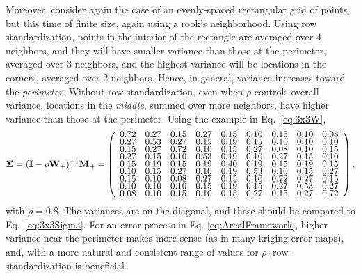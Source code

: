 \documentclass[11pt, titlepage]{article}\usepackage[]{graphicx}\usepackage[]{color}
\begin{document}
\begin{spacing}{1.9}
\begin{flushleft}
Moreover, consider again the case of an evenly-spaced rectangular grid of points, but this time of finite size, again using a rook's neighborhood.  Using row standardization, points in the interior of the rectangle are averaged over 4 neighbors, and they will have smaller variance than those at the perimeter, averaged over 3 neighbors, and the highest variance will be locations in the corners, averaged over 2 neighbors.  Hence, in general, variance increases toward the \textit{perimeter}.  Without row standardization, even when $\rho$ controls overall variance, locations in the \textit{middle}, summed over more neighbors, have higher variance than those at the perimeter.  Using the example in Eq.~\ref{eq:3x3W},
\[
\renewcommand\arraystretch{.5}
\bSigma = (\bI - \rho\bW_+)\upi\bM_+ =\left(
\begin{array}{ccccccccc}
 0.72 & 0.27 & 0.15 & 0.27 & 0.15 & 0.10 & 0.15 & 0.10 & 0.08 \\ 
  0.27 & 0.53 & 0.27 & 0.15 & 0.19 & 0.15 & 0.10 & 0.10 & 0.10 \\ 
  0.15 & 0.27 & 0.72 & 0.10 & 0.15 & 0.27 & 0.08 & 0.10 & 0.15 \\ 
  0.27 & 0.15 & 0.10 & 0.53 & 0.19 & 0.10 & 0.27 & 0.15 & 0.10 \\ 
  0.15 & 0.19 & 0.15 & 0.19 & 0.40 & 0.19 & 0.15 & 0.19 & 0.15 \\ 
  0.10 & 0.15 & 0.27 & 0.10 & 0.19 & 0.53 & 0.10 & 0.15 & 0.27 \\ 
  0.15 & 0.10 & 0.08 & 0.27 & 0.15 & 0.10 & 0.72 & 0.27 & 0.15 \\ 
  0.10 & 0.10 & 0.10 & 0.15 & 0.19 & 0.15 & 0.27 & 0.53 & 0.27 \\ 
  0.08 & 0.10 & 0.15 & 0.10 & 0.15 & 0.27 & 0.15 & 0.27 & 0.72 \\ 
  
\end{array}
\right),
\]
with $\rho = 0.8$. The variances are on the diagonal, and these should be compared to Eq.~\ref{eq:3x3Sigma}. For an error process in Eq. \ref{eq:ArealFramework}, higher variance near the perimeter makes more sense (as in many kriging error maps), and, with a more natural and consistent range of values for $\rho$, row-standardization is beneficial. 


\end{flushleft}
\end{spacing}
\end{document}
